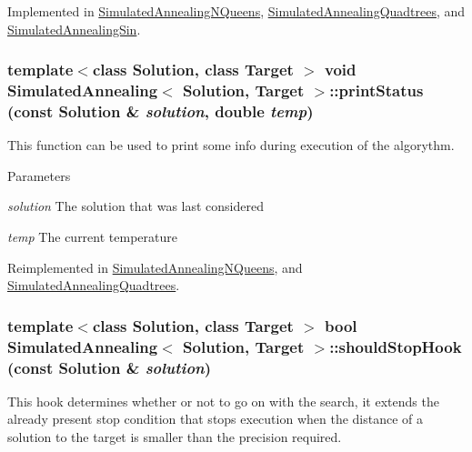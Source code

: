 Implemented in \hyperlink{class_simulated_annealing_n_queens_a137985c9ff6d0e88cdaf5859c29b7e19}{SimulatedAnnealingNQueens}, \hyperlink{class_simulated_annealing_quadtrees_abb953a7ff8aa3bed1d6fc99d3a3616ed}{SimulatedAnnealingQuadtrees}, and \hyperlink{class_simulated_annealing_sin_acd5444d158d2877c3d95472cdb8b5297}{SimulatedAnnealingSin}.\hypertarget{class_simulated_annealing_accc3e21d0c77ac87ce604f17e014c11d}{
\subsubsection[{printStatus}]{\setlength{\rightskip}{0pt plus 5cm}template$<$class Solution, class Target $>$ void {\bf SimulatedAnnealing}$<$ Solution, Target $>$::printStatus (const Solution \& {\em solution}, \/  double {\em temp})}}
\label{class_simulated_annealing_accc3e21d0c77ac87ce604f17e014c11d}
This function can be used to print some info during execution of the algorythm. 
\begin{DoxyParams}{Parameters}
\item[{\em solution}]The solution that was last considered \item[{\em temp}]The current temperature \end{DoxyParams}


Reimplemented in \hyperlink{class_simulated_annealing_n_queens_a8165b39087c35fa62127c7f392e25d8b}{SimulatedAnnealingNQueens}, and \hyperlink{class_simulated_annealing_quadtrees_a4228034780e8cdebe3beb9c89a646373}{SimulatedAnnealingQuadtrees}.\hypertarget{class_simulated_annealing_a52fd0bfedf6b9102adaba0ad494c8d54}{
\subsubsection[{shouldStopHook}]{\setlength{\rightskip}{0pt plus 5cm}template$<$class Solution, class Target $>$ bool {\bf SimulatedAnnealing}$<$ Solution, Target $>$::shouldStopHook (const Solution \& {\em solution})}}
\label{class_simulated_annealing_a52fd0bfedf6b9102adaba0ad494c8d54}
This hook determines whether or not to go on with the search, it extends the already present stop condition that stops execution when the distance of a solution to the target is smaller than the precision required.

